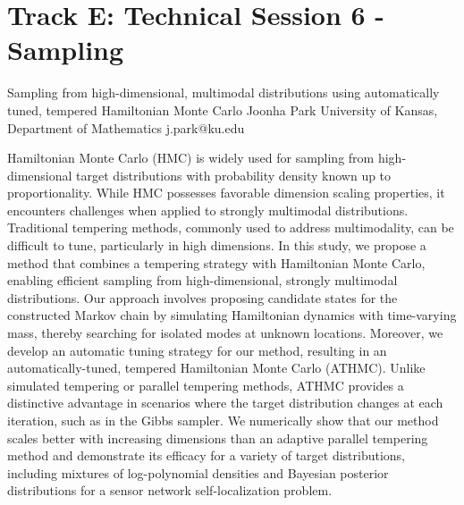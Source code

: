 \section{Track E: Technical Session 6 - Sampling}\newpage

\begin{talk}
  {Sampling from high-dimensional, multimodal distributions
using automatically tuned, tempered Hamiltonian Monte Carlo}%
  {Joonha Park}%
  {University of Kansas, Department of Mathematics}%
  {j.park@ku.edu}%
  {}%
  
    

Hamiltonian Monte Carlo (HMC) is widely used for sampling from high-dimensional target distributions with probability density known up to proportionality. While HMC possesses favorable dimension scaling properties, it encounters challenges when applied to strongly multimodal distributions. Traditional tempering methods, commonly used to address multimodality, can be diﬃcult to tune, particularly in high dimensions. In this study, we propose a method that combines a tempering strategy with Hamiltonian Monte Carlo, enabling eﬃcient sampling from high-dimensional, strongly multimodal distributions. Our approach involves proposing candidate states for the constructed Markov chain by simulating Hamiltonian dynamics with time-varying mass, thereby searching for isolated modes at unknown locations. Moreover, we develop an automatic tuning strategy for our method, resulting in an automatically-tuned, tempered Hamiltonian Monte Carlo (ATHMC). Unlike simulated tempering or parallel tempering methods, ATHMC provides a distinctive advantage in scenarios where the target distribution changes at each iteration, such as in the Gibbs sampler. We numerically show that our method scales better with increasing dimensions than an adaptive parallel tempering method and demonstrate its eﬃcacy for a variety of target distributions, including mixtures of log-polynomial densities and Bayesian posterior distributions for a sensor network self-localization problem.
   
\end{talk}

